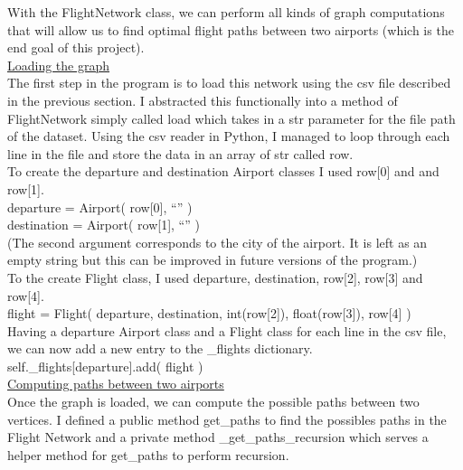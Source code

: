 \documentclass[fontsize=11pt]{article}
\begin{document}
\noindent
With the FlightNetwork class, we can perform all kinds of graph computations that will allow us to find optimal flight paths between two airports (which is the end goal of this project).\\

\noindent
\underline{Loading the graph}\\

\noindent
The first step in the program is to load this network using the csv file described in the previous section. I abstracted this functionally into a method of FlightNetwork simply called load which takes in a str parameter for the file path of the dataset. Using the csv reader in Python, I managed to loop through each line in the file and store the data in an array of str called row.\\

\noindent
To create the departure and destination Airport classes I used row[0] and and row[1].\\

\noindent
departure = Airport( row[0], “” )\\
destination = Airport( row[1], “” )\\

\noindent
(The second argument corresponds to the city of the airport. It is left as an empty string but this can be improved in future versions of the program.)\\

\noindent
To the create Flight class, I used departure, destination, row[2], row[3] and row[4].\\

\noindent
flight = Flight( departure, destination, int(row[2]), float(row[3]), row[4] )\\

\noindent
Having a departure Airport class and a Flight class for each line in the csv file, we can now add a new entry to the \_flights dictionary.\\

\noindent
self.\_flights[departure].add( flight )\\

\noindent
\underline{Computing paths between two airports}\\

\noindent
Once the graph is loaded, we can compute the possible paths between two vertices. I defined a public method get\_paths to find the possibles paths in the Flight Network and a private method \_get\_paths\_recursion which serves a helper method for get\_paths to perform recursion.\\
\end{document}
